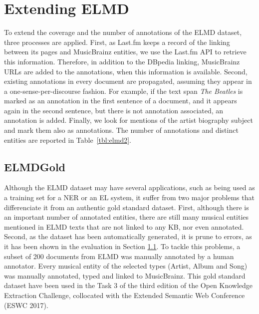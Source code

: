 \section{Extending ELMD}

To extend the coverage and the number of annotations of the \textsc{ELMD} dataset, three processes are applied. First, as Last.fm keeps a record of the linking between its pages and MusicBrainz entities, we use the Last.fm API to retrieve this information. Therefore, in addition to the DBpedia linking, MusicBrainz URLs are added to the annotations, when this information is available. Second, existing annotations in every document are propagated, assuming they appear in a one-sense-per-discourse fashion. For example, if the text span \textit{The Beatles} is marked as an annotation in the first sentence of a document, and it appears again in the second sentence, but there is not annotation associated, an annotation is added. Finally, we look for mentions of the artist biography subject and mark them also as annotations. The number of annotations and distinct entities are reported in Table~\ref{tbl:elmd2}.


\subsection{ELMDGold}

Although the \textsc{ELMD} dataset may have several applications, such as being used as a training set for a NER or an EL system, it suffer from two major problems that differenciate it from an authentic gold standard dataset. First, although there is an important number of annotated entities, there are still many musical entities mentioned in \textsc{ELMD} texts that are not linked to any KB, nor even annotated. Second, as the dataset has been automatically generated, it is prune to errors, as it has been shown in the evaluation in Section \ref{}. To tackle this problems, a subset of 200 documents from \textsc{ELMD} was manually annotated by a human annotator. Every musical entity of the selected types (Artist, Album and Song) was manually annotated, typed and linked to MusicBrainz. 
This gold standard dataset have been used in the Task 3 of the third edition of the Open Knowledge Extraction Challenge, collocated with the Extended Semantic Web Conference (ESWC 2017)\cite{}.



